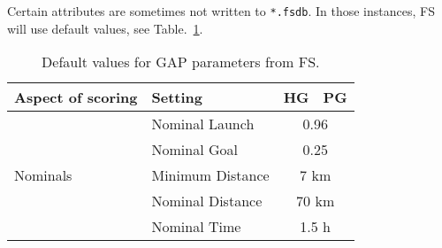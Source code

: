 \documentclass[gap.tex]{subfiles}
\begin{document}
Certain attributes are sometimes not written to \texttt{*.fsdb}. In those
instances, FS will use default values, see Table.~\ref{tab:gap-defaults}.

\begin{table}[!ht]
    \begin{tabularx}{\textwidth}{|X|l|c|c|}
    \hline
        Aspect of scoring
        & Setting
        & HG
        & PG
        \\
    \hline
        \multirow{5}{*}{Nominals}
        & Nominal Launch
        & \multicolumn{2}{c|}{0.96}
        \\
    \cline{2-4}
        & Nominal Goal
        & \multicolumn{2}{c|}{0.25}
        \\
    \cline{2-4}
        & Minimum Distance
        & \multicolumn{2}{c|}{7 km}
        \\
    \cline{2-4}
        & Nominal Distance
        & \multicolumn{2}{c|}{70 km}
        \\
    \cline{2-4}
        & Nominal Time
        & \multicolumn{2}{c|}{1.5 h}
        \\
    \hline
    \end{tabularx}
    \caption{Default values for GAP parameters from FS.}
    \label{tab:gap-defaults}
\end{table}
\end{document}
